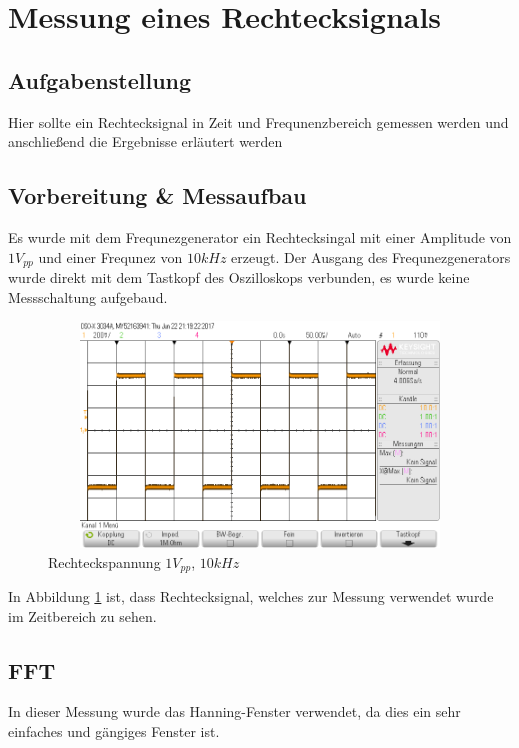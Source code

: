 \section{Messung eines Rechtecksignals}
\subsection{Aufgabenstellung}
Hier sollte ein Rechtecksignal in Zeit und Frequnenzbereich gemessen werden und anschlie\ss{}end die Ergebnisse erl\"autert werden

\subsection{Vorbereitung \& Messaufbau}
Es wurde mit dem Frequnezgenerator ein Rechtecksingal mit einer Amplitude von $1V_{pp}$ und einer Frequnez von $10kHz$ erzeugt. Der Ausgang des Frequnezgenerators wurde direkt mit dem Tastkopf des Oszilloskops verbunden, es wurde keine Messschaltung aufgebaud.

\begin{figure}[H]
 \begin{center}
  \includegraphics[height=6cm,width=12cm]{OsziBilder/bsp2_time.png}
 \end{center}
 \caption{Rechteckspannung $1V_{pp}$, $10kHz$}\label{bsp2_time}
\end{figure}
\noindent
In Abbildung \ref{bsp2_time} ist, dass Rechtecksignal, welches zur Messung verwendet wurde im Zeitbereich zu sehen. \\
\newpage

\subsection{FFT}
In dieser Messung wurde das Hanning-Fenster verwendet, da dies ein sehr einfaches und g\"angiges Fenster ist.

